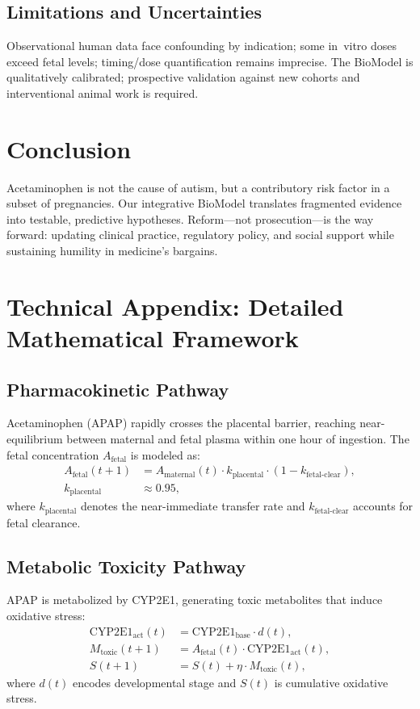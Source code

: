 \documentclass[12pt]{article}
\begin{document}
\subsection{Limitations and Uncertainties}
Observational human data face confounding by indication; some in~vitro doses exceed fetal levels; timing/dose quantification remains imprecise. The BioModel is qualitatively calibrated; prospective validation against new cohorts and interventional animal work is required.

\section{Conclusion}
Acetaminophen is not the cause of autism, but a contributory risk factor in a subset of pregnancies. Our integrative BioModel translates fragmented evidence into testable, predictive hypotheses. Reform---not prosecution---is the way forward: updating clinical practice, regulatory policy, and social support while sustaining humility in medicine's bargains.

\appendix
\section{Technical Appendix: Detailed Mathematical Framework}

\subsection{Pharmacokinetic Pathway}
Acetaminophen (APAP) rapidly crosses the placental barrier, reaching near-equilibrium between maternal and fetal plasma within one hour of ingestion. The fetal concentration $A_{\text{fetal}}$ is modeled as:
\begin{align}
A_{\text{fetal}}(t+1) &= A_{\text{maternal}}(t) \cdot k_{\text{placental}} \cdot \left( 1 - k_{\text{fetal-clear}} \right), \\
k_{\text{placental}} &\approx 0.95,
\end{align}
where $k_{\text{placental}}$ denotes the near-immediate transfer rate and $k_{\text{fetal-clear}}$ accounts for fetal clearance.

\subsection{Metabolic Toxicity Pathway}
APAP is metabolized by CYP2E1, generating toxic metabolites that induce oxidative stress:
\begin{align}
\text{CYP2E1}_{\text{act}}(t) &= \text{CYP2E1}_{\text{base}} \cdot d(t), \\
M_{\text{toxic}}(t+1) &= A_{\text{fetal}}(t) \cdot \text{CYP2E1}_{\text{act}}(t), \\
S(t+1) &= S(t) + \eta \cdot M_{\text{toxic}}(t),
\end{align}
where $d(t)$ encodes developmental stage and $S(t)$ is cumulative oxidative stress.
\end{document}
